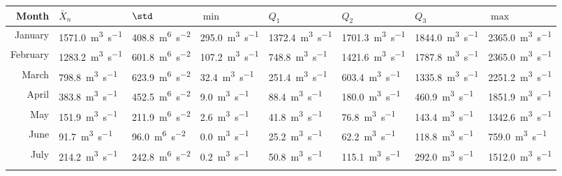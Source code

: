 \begin{tabularx}{\linewidth}{r>{\centering\arraybackslash}X>{\centering\arraybackslash}X>{\centering\arraybackslash}X>{\centering\arraybackslash}X>{\centering\arraybackslash}X>{\centering\arraybackslash}X>{\centering\arraybackslash}X}
\toprule  Month & $\bar{X}_n$ & $\std$ & $\min$ & $Q_1$ & $Q_2$ & $Q_3$ & $\max$\\\midrule
  January & \qty{1571.0}{\metre\cubed\per\second} & \qty{408.8}{\metre^6\per\second\squared} & \qty{295.0}{\metre\cubed\per\second} & \qty{1372.4}{\metre\cubed\per\second} & \qty{1701.3}{\metre\cubed\per\second} & \qty{1844.0}{\metre\cubed\per\second} & \qty{2365.0}{\metre\cubed\per\second}\\\addlinespace
  February & \qty{1283.2}{\metre\cubed\per\second} & \qty{601.8}{\metre^6\per\second\squared} & \qty{107.2}{\metre\cubed\per\second} & \qty{748.8}{\metre\cubed\per\second} & \qty{1421.6}{\metre\cubed\per\second} & \qty{1787.8}{\metre\cubed\per\second} & \qty{2365.0}{\metre\cubed\per\second}\\\addlinespace
  March & \qty{798.8}{\metre\cubed\per\second} & \qty{623.9}{\metre^6\per\second\squared} & \qty{32.4}{\metre\cubed\per\second} & \qty{251.4}{\metre\cubed\per\second} & \qty{603.4}{\metre\cubed\per\second} & \qty{1335.8}{\metre\cubed\per\second} & \qty{2251.2}{\metre\cubed\per\second}\\\addlinespace
  April & \qty{383.8}{\metre\cubed\per\second} & \qty{452.5}{\metre^6\per\second\squared} & \qty{9.0}{\metre\cubed\per\second} & \qty{88.4}{\metre\cubed\per\second} & \qty{180.0}{\metre\cubed\per\second} & \qty{460.9}{\metre\cubed\per\second} & \qty{1851.9}{\metre\cubed\per\second}\\\addlinespace
  May & \qty{151.9}{\metre\cubed\per\second} & \qty{211.9}{\metre^6\per\second\squared} & \qty{2.6}{\metre\cubed\per\second} & \qty{41.8}{\metre\cubed\per\second} & \qty{76.8}{\metre\cubed\per\second} & \qty{143.4}{\metre\cubed\per\second} & \qty{1342.6}{\metre\cubed\per\second}\\\addlinespace
  June & \qty{91.7}{\metre\cubed\per\second} & \qty{96.0}{\metre^6\per\second\squared} & \qty{0.0}{\metre\cubed\per\second} & \qty{25.2}{\metre\cubed\per\second} & \qty{62.2}{\metre\cubed\per\second} & \qty{118.8}{\metre\cubed\per\second} & \qty{759.0}{\metre\cubed\per\second}\\\addlinespace
  July & \qty{214.2}{\metre\cubed\per\second} & \qty{242.8}{\metre^6\per\second\squared} & \qty{0.2}{\metre\cubed\per\second} & \qty{50.8}{\metre\cubed\per\second} & \qty{115.1}{\metre\cubed\per\second} & \qty{292.0}{\metre\cubed\per\second} & \qty{1512.0}{\metre\cubed\per\second}\\\addlinespace

\end{tabularx}
